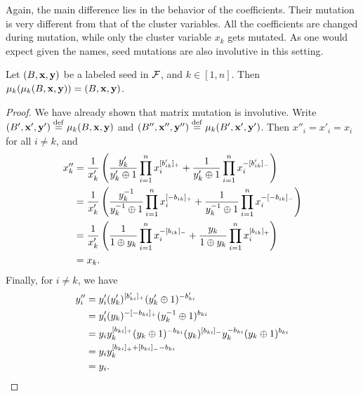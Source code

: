 Again, the main difference lies in the behavior of the coefficients. Their mutation is
very different from that of the cluster variables. All the coefficients are changed
during mutation, while only the cluster variable $x_k$ gets mutated. As one would
expect given the names, seed mutations are also involutive in this setting.

\begin{proposition}\label{prop:seed_mutation_involutive}

	Let $(B, \mathbf{x}, \mathbf{y})$ be a labeled seed in $\mathcal{F}$, and $k \in [1, n]$. Then
	$\mu_k(\mu_k(B, \mathbf{x}, \mathbf{y})) = (B, \mathbf{x}, \mathbf{y})$.
\end{proposition}
\begin{proof}

	We have already shown that matrix mutation is involutive. Write $(B', \mathbf{x}', \mathbf{y}')
		\overset{\mathrm{def}}{=} \mu_k(B, \mathbf{x}, \mathbf{y})$ and $(B'', \mathbf{x}'', \mathbf{y}'') \overset{\mathrm{def}}{=} \mu_k(B', \mathbf{x}', \mathbf{y}')$. Then
	$x''_i = x'_i = x_i$ for all $i \neq k$, and
	\begin{align*}
		x_k''
		 & = \frac{1}{x_k'}\left(\frac{y'_k}{y'_k \oplus 1} \prod_{i=1}^n x_i^{[b'_{ik}]_{+}} + \frac{1}{y'_k \oplus 1}\prod_{i=1}^n x_i^{-[b'_{ik}]_{-}}\right)          \\
		 & = \frac{1}{x_k'}\left(\frac{y_k^{-1}}{y_k^{-1} \oplus 1} \prod_{i=1}^n x_i^{[-b_{ik}]_{+}} + \frac{1}{y_k^{-1} \oplus 1}\prod_{i=1}^n x_i^{-[-b_{ik}]_{-}}\right) \\
		 & = \frac{1}{x_k'}\left(\frac{1}{1 \oplus y_k} \prod_{i=1}^n x_i^{-[b_{ik}]_{-}} + \frac{y_k}{1 \oplus y_k}\prod_{i=1}^n x_i^{[b_{ik}]_{+}}\right)               \\
		 & = x_k.
	\end{align*}
	Finally, for $i \neq k$, we have
	\begin{align*}
		y''_i
		 & = y_i' (y'_k)^{[b'_{ki}]_{+}}(y'_k \oplus 1)^{-b'_{ki}}                                                   \\
		 & = y_i' (y_k)^{-[-b_{ki}]_{+}}(y_k^{-1} \oplus 1)^{b_{ki}}                                                  \\
		 & = y_i y_k^{[b_{ki}]_{+}}(y_k \oplus 1)^{-b_{ki}} (y_k)^{[b_{ki}]_{-}}y_k^{-b_{ki}}(y_k \oplus 1)^{b_{ki}} \\
		 & = y_i y_k^{[b_{ki}]_{+} + [b_{ki}]_{-} - b_{ki}}                                                          \\
		 & = y_i.
	\end{align*}
\end{proof}

